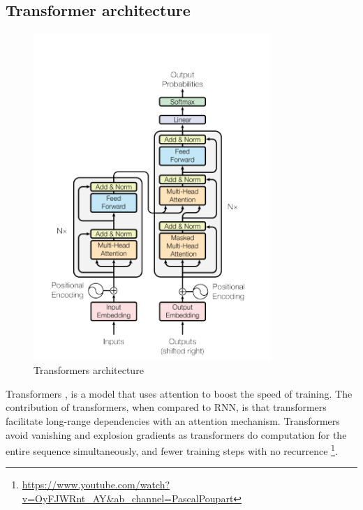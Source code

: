 \subsection{Transformer architecture}
\begin{figure}[]
         \includegraphics[width=9cm]{thesis/figures/Transformers.PNG}
            \centering
            \caption{Transformers architecture  \cite{vaswani2017attention}}
            \label{fig:Transformers}
\end{figure}

Transformers \cite{vaswani2017attention}, is a model that uses attention to boost the speed of training. The contribution of transformers, when compared to RNN, is that transformers facilitate long-range dependencies with an attention mechanism. Transformers avoid vanishing and explosion gradients as transformers do computation for the entire sequence simultaneously, and fewer training steps with no recurrence \footnote{\url{https://www.youtube.com/watch?v=OyFJWRnt_AY&ab_channel=PascalPoupart}}\cite{vaswani2017attention}.  

